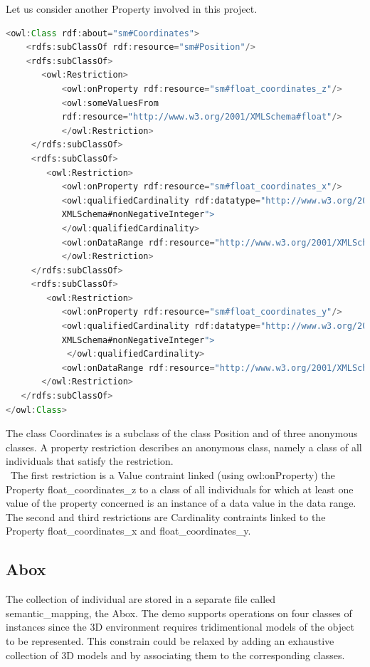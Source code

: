 Let us consider another Property involved in this project.

\begin{lstlisting}[language=Java,basicstyle=\fontsize{9}{9}\selectfont\ttfamily]
<owl:Class rdf:about="sm#Coordinates">
    <rdfs:subClassOf rdf:resource="sm#Position"/>
    <rdfs:subClassOf>
       <owl:Restriction>
           <owl:onProperty rdf:resource="sm#float_coordinates_z"/>
           <owl:someValuesFrom 
           rdf:resource="http://www.w3.org/2001/XMLSchema#float"/>
           </owl:Restriction>
     </rdfs:subClassOf>
     <rdfs:subClassOf>
        <owl:Restriction>
           <owl:onProperty rdf:resource="sm#float_coordinates_x"/>
           <owl:qualifiedCardinality rdf:datatype="http://www.w3.org/2001/
           XMLSchema#nonNegativeInteger">
           </owl:qualifiedCardinality>
           <owl:onDataRange rdf:resource="http://www.w3.org/2001/XMLSchema#float"/>
           </owl:Restriction>
     </rdfs:subClassOf>
     <rdfs:subClassOf>
        <owl:Restriction>
           <owl:onProperty rdf:resource="sm#float_coordinates_y"/>
           <owl:qualifiedCardinality rdf:datatype="http://www.w3.org/2001/
           XMLSchema#nonNegativeInteger">
			</owl:qualifiedCardinality>
           <owl:onDataRange rdf:resource="http://www.w3.org/2001/XMLSchema#float"/>
       </owl:Restriction>
   </rdfs:subClassOf>
</owl:Class>   
\end{lstlisting}

The class Coordinates is a subclass of the class Position and of three anonymous classes. A property restriction describes an anonymous class, namely a class of all individuals that satisfy the restriction. \\\
The first restriction is a Value contraint linked (using owl:onProperty) the Property float\_coordinates\_z  to a class of all individuals for which at least one value of the property concerned is an instance of a data value in the data range.\\
The second and third restrictions are Cardinality contraints linked to the Property float\_coordinates\_x and float\_coordinates\_y.


\subsection{Abox}
\label{subsec:abox}
The collection of individual are stored in a separate file called semantic\_mapping, the Abox. The demo supports operations on four classes of instances since the 3D environment requires tridimentional models of the object to be represented. This constrain could be relaxed by adding an exhaustive collection of 3D models and by associating them to the corresponding classes.\\

